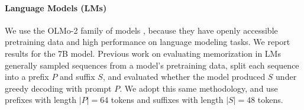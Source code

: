 \documentclass{article} %
\begin{document}
\paragraph{Language Models (LMs)}
\label{sec:lm_methods}
We use the OLMo-2 family of models \citep{olmo20242}, because they have openly accessible pretraining data and high performance on language modeling tasks. We report results for the 7B model. Previous work on evaluating memorization in LMs \citep{carlini2019secret, huang2024demystifying, shokri2017membership, carlini2022quantifying} generally sampled sequences from a model's pretraining data, split each sequence into a prefix $P$ and suffix $S$, and evaluated whether the model produced $S$ under greedy decoding with prompt $P$. We adopt this same methodology, and use prefixes with length $|P|=64$ tokens and suffixes with length $|S|=48$ tokens. 
\end{document}

